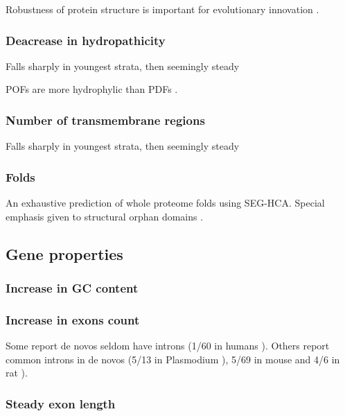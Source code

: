     Robustness of protein structure is important for evolutionary
    innovation \cite{bloom_structural_2006, bloom_protein_2006,
    bloom_evolution_2007}.


  \subsubsection{Deacrease in hydropathicity}

    Falls sharply in youngest strata, then seemingly steady
    \cite{carvunis_proto-genes_2012}

    POFs are more hydrophylic than PDFs \cite{gollery_what_2006}.

  \subsubsection{Number of transmembrane regions}

    Falls sharply in youngest strata, then seemingly steady
    \cite{carvunis_proto-genes_2012}
    

  \subsubsection{Folds}

    An exhaustive prediction of whole proteome folds using SEG-HCA. Special
    emphasis given to structural orphan domains \cite{faure_comprehensive_2013}.

\subsection{Gene properties} \subsubsection{Increase in GC content}
\subsubsection{Increase in exons count}

    Some report de novos seldom have introns (1/{60} in humans
    \cite{wu_novo_2011}). Others report common introns in de novos (5/{13}
    in Plasmodium \cite{yang_novo_2011}), 5/{69} in mouse and 4/{6} in rat
    \cite{murphy_novo_2012}).


  \subsubsection{Steady exon length}

